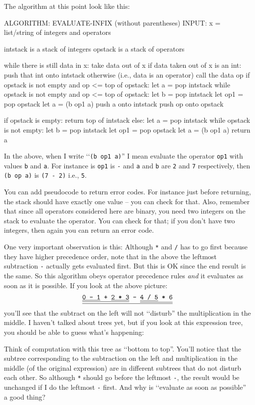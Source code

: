The algorithm at this point look like this:
\begin{console}
ALGORITHM: EVALUATE-INFIX (without parentheses)
INPUT: x = list/string of integers and operators

intstack is a stack of integers
opstack is a stack of operators

while there is still data in x:
    take data out of x
    if data taken out of x is an int:
        push that int onto intstack
    otherwise (i.e., data is an operator)
        call the data op
        if opstack is not empty and op <= top of opstack:
            let a = pop intstack
            while opstack is not empty and
                op <= top of opstack:
                let b = pop intstack
                let op1 = pop opstack
                let a = (b op1 a)
            push a onto intstack
        push op onto opstack

if opstack is empty:
    return top of intstack
else:
    let a = pop intstack
    while opstack is not empty:
        let b = pop intstack
        let op1 = pop opstack
        let a = (b op1 a)
    return a
\end{console}
In the above, when I write \lq\lq \texttt{(b op1 a)}''
I mean evaluate the operator \texttt{op1} with values
\texttt{b} and \texttt{a}.
For instance is \texttt{op1} is \texttt{-}
and \texttt{a} and \texttt{b} are \texttt{2} and \texttt{7}
respectively, then \texttt{(b op a)} is \texttt{(7 - 2)}
i.e., \texttt{5}.

You can add pseudocode to return error codes.
For instance just before
returning, the stack should have exactly one
value -- you can check for that.
Also, remember that since all operators considered here
are binary, you need two integers on the stack to
evaluate the operator.
You can check for that; if you don't have two integers,
then again you can return an error code.

One very important observation is this:
Although \texttt{*} and \verb!/! has to go first
  because they have higher precedence order,
  note that in the above the leftmost subtraction \texttt{-}
  actually gets evaluated first.
  But this is OK since the end result is the same.
  So this algorithm obeys operator precedence rules
  \textit{and} it evaluates as soon as it is possible.
  If you look at the above picture:
\[
\text{
  \texttt{
    \underline{\underline{\underline{0 - 1} + \underline{2 * 3}} -
      \underline{\underline{4 / 5} * 6}}
  }
}
\]
you'll see that the subtract on the left will not \lq\lq disturb''
the multiplication in the middle.
I haven't talked about trees yet, but if you look at this expression
tree, you should be able to guess what's happening:

Think of computation with this tree as \lq\lq bottom to top''.
You'll notice that the subtree corresponding to the subtraction on
the left and multiplication in the middle (of the original expression)
are in different subtrees that do not disturb each other.
So although \texttt{*} should go before the leftmost \texttt{-},
the result would be unchanged if I do the leftmost \texttt{-} first.
And why is \lq\lq evaluate as soon as possible'' a good thing?

